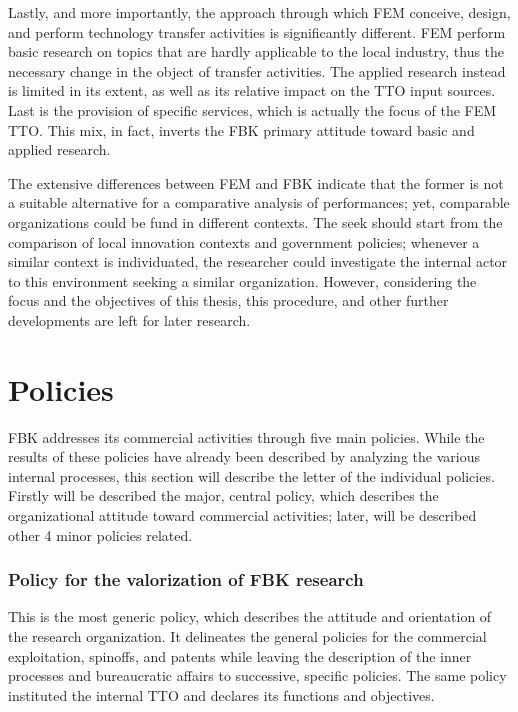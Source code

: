 Lastly, and more importantly, the approach through which FEM conceive, design, and perform technology transfer activities is significantly different. FEM perform basic research on topics that are hardly applicable to the local industry, thus the necessary change in the object of transfer activities. The applied research instead is limited in its extent, as well as its relative impact on the TTO input sources. Last is the provision of specific services, which is actually the focus of the FEM TTO. This mix, in fact, inverts the FBK primary attitude toward basic and applied research.

The extensive differences between FEM and FBK indicate that the former is not a suitable alternative for a comparative analysis of performances; yet, comparable organizations could be fund in different contexts. The seek should start from the comparison of local innovation contexts and government policies; whenever a similar context is individuated, the researcher could investigate the internal actor to this environment seeking a similar organization. However, considering the focus and the objectives of this thesis, this procedure, and other further developments are left for later research.

\section{Policies}

FBK addresses its commercial activities through five main policies. While the results of these policies have already been described by analyzing the various internal processes, this section will describe the letter of the individual policies. Firstly will be described the major, central policy, which describes the organizational attitude toward commercial activities; later, will be described other 4 minor policies related.

\subsubsection{Policy for the valorization of FBK research}

This is the most generic policy, which describes the attitude and orientation of the research organization. It delineates the general policies for the commercial exploitation, spinoffs, and patents while leaving the description of the inner processes and bureaucratic affairs to successive, specific policies. The same policy instituted the internal TTO and declares its functions and objectives.

